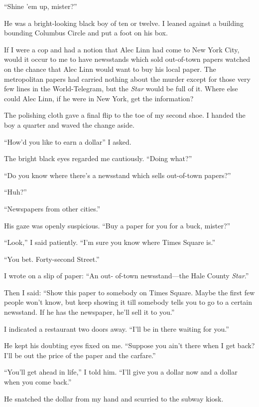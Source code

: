 \documentclass{novel}
\begin{document}
“Shine ’em up, mister?”

He was a bright-looking black boy of ten or twelve. I leaned against a building bounding Columbus Circle and put a foot on his box.

\scenestars

If I were a cop and had a notion that Alec Linn had come to New York City, would it occur to me to have newsstands which sold out-of-town papers watched on the chance that Alec Linn would want to buy his local paper. The metropolitan papers had carried nothing about the murder except for those very few lines in the World-Telegram, but the \textit{Star} would be full of it. Where else could Alec Linn, if he were in New York, get the information?

The polishing cloth gave a final flip to the toe of my second shoe. I handed the boy a quarter and waved the change aside. 

“How’d you like to earn a dollar” I asked.

The bright black eyes regarded me cautiously. “Doing what?”

“Do you know where there’s a newsstand which sells out-of-town papers?”

“Huh?”

“Newspapers from other cities.”

His gaze was openly suspicious. “Buy a paper for you for a buck, mister?”

“Look,” I said patiently. “I’m sure you know where Times Square is.”

“You bet. Forty-second Street.”

I wrote on a slip of paper: “An out- of-town newsstand—the Hale County \textit{Star}.” 

Then I said: “Show this paper to somebody on Times Square. Maybe the first few people won’t know, but keep showing it till somebody tells you to go to a certain newsstand. If he has the newspaper, he’ll sell it to you.” 

I indicated a restaurant two doors away. “I’ll be in there waiting for you.”

He kept his doubting eyes fixed on me. “Suppose you ain’t there when I get back? I’ll be out the price of the paper and the carfare.”

“You’ll get ahead in life,” I told him. “I’ll give you a dollar now and a dollar when you come back.”

He snatched the dollar from my hand and scurried to the subway kiosk.
\end{document}

